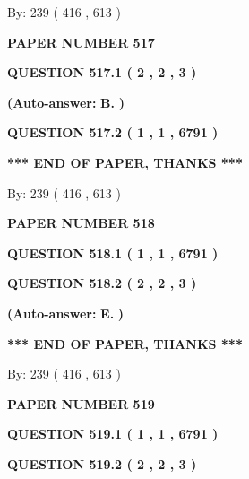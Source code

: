 \documentclass[12pt]{article}
\begin{document}
   
\hspace{1.0in} By: 
 239 ( 416 ,  613 )
   
   
   
   
\newpage 
\setcounter{page}{ 
   517001 } 
   
   
 {\textbf{ \Large{ PAPER NUMBER  517  }}}
   
   
   
   
  
  
{\textbf{\large{QUESTION
517.1 
 ( 2 , 2 , 3 )
}}}
 
 
{\textbf{(Auto-answer:}}
{\textbf{\large{
B.}}}
{\textbf{)}}
 
 
  
  
{\textbf{\large{QUESTION
517.2 
 ( 1 , 1 , 6791 )
}}}
   
   
   
   
\vspace{1.0in} 
{\textbf{\large{ *** END OF PAPER, THANKS *** }}} 
   
   
\hspace{1.0in} By: 
 239 ( 416 ,  613 )
   
   
   
   
\newpage 
\setcounter{page}{ 
   518001 } 
   
   
 {\textbf{ \Large{ PAPER NUMBER  518  }}}
   
   
   
   
  
  
{\textbf{\large{QUESTION
518.1 
 ( 1 , 1 , 6791 )
}}}
  
  
{\textbf{\large{QUESTION
518.2 
 ( 2 , 2 , 3 )
}}}
 
 
{\textbf{(Auto-answer:}}
{\textbf{\large{
E.}}}
{\textbf{)}}
 
 
   
   
   
   
\vspace{1.0in} 
{\textbf{\large{ *** END OF PAPER, THANKS *** }}} 
   
   
\hspace{1.0in} By: 
 239 ( 416 ,  613 )
   
   
   
   
\newpage 
\setcounter{page}{ 
   519001 } 
   
   
 {\textbf{ \Large{ PAPER NUMBER  519  }}}
   
   
   
   
  
  
{\textbf{\large{QUESTION
519.1 
 ( 1 , 1 , 6791 )
}}}
  
  
{\textbf{\large{QUESTION
519.2 
 ( 2 , 2 , 3 )
}}}
 
\end{document}
